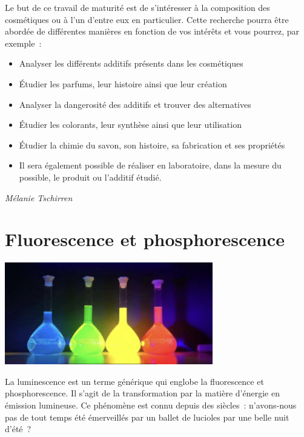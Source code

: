 \documentclass[
  10pt,
  french,
  a5paper,
  openany]{book}
\providecommand{\tightlist}{%
  \setlength{\itemsep}{0pt}\setlength{\parskip}{0pt}}
\newenvironment{signature}{\begin{flushright}}{\end{flushright}}
\begin{document}
Le but de ce travail de maturité est de s'intéresser à la composition des cosmétiques ou à l'un d'entre eux en particulier. Cette recherche pourra être abordée de différentes manières en fonction de vos intérêts et vous pourrez, par exemple~:

\begin{itemize}
\tightlist
\item
  Analyser les différents additifs présents dans les cosmétiques
\item
  Étudier les parfums, leur histoire ainsi que leur création
\item
  Analyser la dangerosité des additifs et trouver des alternatives
\item
  Étudier les colorants, leur synthèse ainsi que leur utilisation
\item
  Étudier la chimie du savon, son histoire, sa fabrication et ses propriétés
\item
  Il sera également possible de réaliser en laboratoire, dans la mesure du possible, le produit ou l'additif étudié.
\end{itemize}

\begin{signature}
\emph{Mélanie Tschirren}

\end{signature}

\hypertarget{fluorescence-et-phosphorescence}{%
\chapter{Fluorescence et phosphorescence}\label{fluorescence-et-phosphorescence}}

\begin{center}
\includegraphics[width=\textwidth,height=12em]{images/fluorescence-et-phosphorescence.jpg}

\end{center}


La luminescence est un terme générique qui englobe la fluorescence et phosphorescence. Il s'agit de la transformation par la matière d'énergie en émission lumineuse. Ce phénomène est connu depuis des siècles~: n'avons-nous pas de tout temps été émerveillés par un ballet de lucioles par une belle nuit d'été~?
\end{document}
